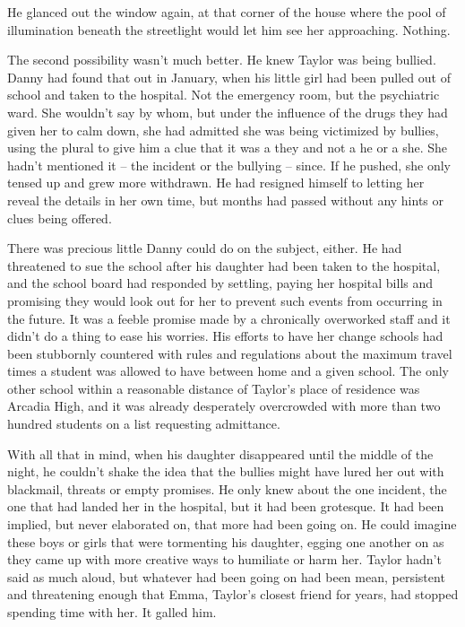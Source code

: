 He glanced out the window again, at that corner of the house where the pool of illumination beneath the streetlight would let him see her approaching.  Nothing.



The second possibility wasn't much better.  He knew Taylor was being bullied.  Danny had found that out in January, when his little girl had been pulled out of school and taken to the hospital.  Not the emergency room, but the psychiatric ward.  She wouldn't say by whom, but under the influence of the drugs they had given her to calm down, she had admitted she was being victimized by bullies, using the plural to give him a clue that it was a they and not a he or a she.  She hadn't mentioned it – the incident or the bullying – since.  If he pushed, she only tensed up and grew more withdrawn.  He had resigned himself to letting her reveal the details in her own time, but months had passed without any hints or clues being offered.



There was precious little Danny could do on the subject, either.  He had threatened to sue the school after his daughter had been taken to the hospital, and the school board had responded by settling, paying her hospital bills and promising they would look out for her to prevent such events from occurring in the future. It was a feeble promise made by a chronically overworked staff and it didn't do a thing to ease his worries.  His efforts to have her change schools had been stubbornly countered with rules and regulations about the maximum travel times a student was allowed to have between home and a given school.  The only other school within a reasonable distance of Taylor's place of residence was Arcadia High, and it was already desperately overcrowded with more than two hundred students on a list requesting admittance.



With all that in mind, when his daughter disappeared until the middle of the night, he couldn't shake the idea that the bullies might have lured her out with blackmail, threats or empty promises.  He only knew about the one incident, the one that had landed her in the hospital, but it had been grotesque.  It had been implied, but never elaborated on, that more had been going on.  He could imagine these boys or girls that were tormenting his daughter, egging one another on as they came up with more creative ways to humiliate or harm her.  Taylor hadn't said as much aloud, but whatever had been going on had been mean, persistent and threatening enough that Emma, Taylor's closest friend for years, had stopped spending time with her.  It galled him.



